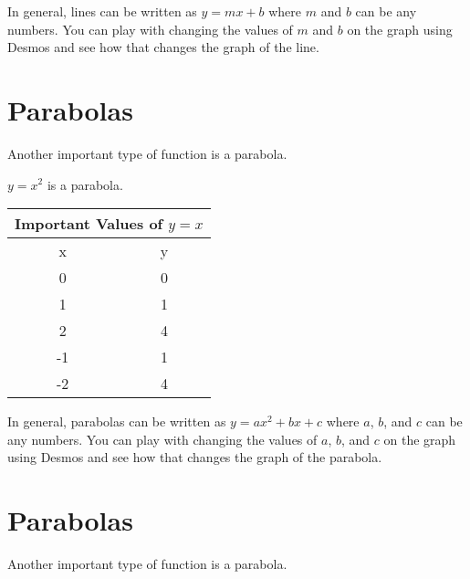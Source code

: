 \documentclass{ximera}
\begin{document}
In general, lines can be written as $y=mx+b$ where $m$ and $b$ can be any numbers.  You can play with changing the values of $m$ and $b$ on the graph using Desmos and see how that changes the graph of the line.  

\begin{center}  
\end{center}

\section{Parabolas}
Another important type of function is a parabola.  

\begin{example}
$y=x^2$ is a parabola.


\begin{tabular}{ |c || c|  }
 \hline
 \multicolumn{2}{|c|}{Important Values of $y=x$} \\
\hline
 \hline
 x & y\\
 \hline
 0&0\\
 1&1\\
 2&4\\
 -1&1\\
 -2&4\\
 \hline
\end{tabular}

\end{example}

In general, parabolas can be written as $y=ax^2+bx+c$ where $a$, $b$, and $c$ can be any numbers.  You can play with changing the values of $a$, $b$, and $c$ on the graph using Desmos and see how that changes the graph of the parabola.  

\begin{center}  
\end{center}




\section{Parabolas}
Another important type of function is a parabola.  
\end{document}

